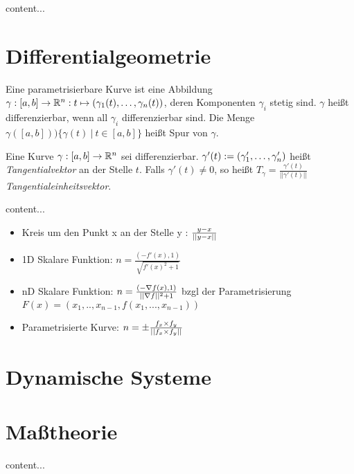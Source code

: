 \begin{satz}
	content...
\end{satz}


\pagebreak

\section{Differentialgeometrie}


\begin{definition}
	Eine parametrisierbare Kurve ist eine Abbildung $\gamma : [a, b] \rightarrow \mathbb{R}^n : t \mapsto (\gamma_1(t), \dots, \gamma_n(t))$, deren Komponenten $\gamma_i$ stetig sind. $\gamma$ heißt differenzierbar, wenn all $\gamma_i$ differenzierbar sind. Die Menge $\gamma([a,b]) ) \{\gamma(t) \medspace | \medspace t \in [a,b] \}$ heißt Spur von $\gamma$.
\end{definition}

\begin{definition}[Tangentialvektor]
	Eine Kurve $\gamma : [a,b] \rightarrow \mathbb{R}^n$ sei differenzierbar. $\gamma'(t) := (\gamma'_1, \dots, \gamma'_n)$ heißt \emph{Tangentialvektor} an der Stelle $t$. Falls $\gamma'(t) \neq 0$, so heißt $T_\gamma = \frac{\gamma'(t)}{||\gamma'(t)||}$ \emph{Tangentialeinheitsvektor}.
\end{definition}

\begin{definition}[Normalenvektor]
	content...
\end{definition}


\begin{satz}
	\begin{itemize}[noitemsep]
		\item Kreis um den Punkt x an der Stelle y : $\frac{y - x}{||y - x||}$
		\item 1D Skalare Funktion: $n = \frac{(-f'(x), 1)}{\sqrt{f'(x)^2 + 1}}$
		\item nD Skalare Funktion: $n = \frac{(-\nabla f(x), 1)}{ ||\nabla f||^2 + 1}$ bzgl der Parametrisierung 
		 $F(x) = (x_1, .., x_{n-1}, f(x_1, ..., x_{n-1}))$	
		\item Parametrisierte Kurve: $n = \pm \frac{f_x \times f_y}{||f_x \times f_y||}$
	\end{itemize}
\end{satz}

\pagebreak



\section{Dynamische Systeme}

\pagebreak

	\section{Maßtheorie}

\begin{definition}
	content...
\end{definition}